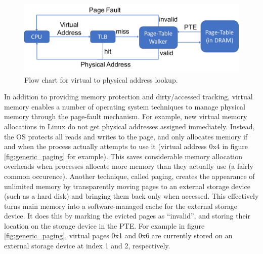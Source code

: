 \begin{figure}[h]
    \centering
    \includegraphics[width=0.9\columnwidth]{figs/generic_paging_flow.pdf}
    \vspace{-5mm}
    \caption{Flow chart for virtual to physical address lookup.}
    \label{fig:generic_paging_flow}
\end{figure}

In addition to providing memory protection and dirty/accessed tracking, virtual
memory enables a number of operating system techniques to manage physical
memory through the page-fault mechanism. For example, new virtual memory
allocations in Linux do not get physical addresses assigned immediately.
Instead, the OS protects all reads and writes to the page, and only allocates
memory if and when the process actually attempts to use it (virtual address 0x4
in figure \ref{fig:generic_paging} for example). This saves considerable memory
allocation overheads when processes allocate more memory than they actually use
(a fairly common occurence). Another technique, called paging, creates the
appearance of unlimited memory by transparently moving pages to an external
storage device (such as a hard disk) and bringing them back only when accessed.
This effectively turns main memory into a software-managed cache for the
external storage device. It does this by marking the evicted pages as
``invalid'', and storing their location on the storage device in the PTE. For
example in figure \ref{fig:generic_paging}, virtual pages 0x1 and 0x6 are
currently stored on an external storage device at index 1 and 2, respectively.
